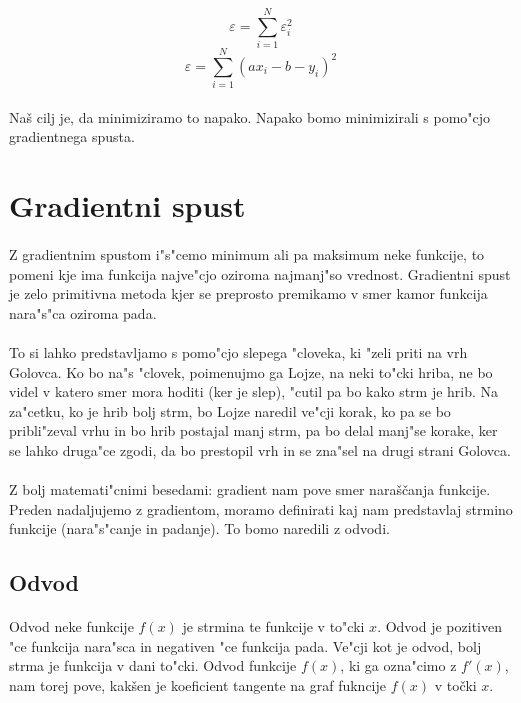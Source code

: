\documentclass[a4paper, 12pt]{article}
\begin{document}
	$$\varepsilon = \sum_{i=1}^{N} \varepsilon_i^2$$
	$$\varepsilon = \sum_{i=1}^{N} (a x_i - b - y_i)^2$$

	\paragraph{}
	Naš cilj je, da minimiziramo to napako. Napako bomo minimizirali s pomo"cjo gradientnega spusta.

	\section*{Gradientni spust}
	\paragraph{}
	Z gradientnim spustom i"s"cemo minimum ali pa maksimum neke funkcije, to pomeni kje ima funkcija najve"cjo oziroma najmanj"so vrednost. Gradientni spust je zelo primitivna metoda kjer se preprosto premikamo v smer kamor funkcija nara"s"ca oziroma pada.

	\paragraph{}
	To si lahko predstavljamo s pomo"cjo slepega "cloveka, ki "zeli priti na vrh Golovca. Ko bo na"s "clovek, poimenujmo ga Lojze, na neki to"cki hriba, ne bo videl v katero smer mora hoditi (ker je slep), "cutil pa bo kako strm je hrib. Na za"cetku, ko je hrib bolj strm, bo Lojze naredil ve"cji korak, ko pa se bo pribli"zeval vrhu in bo hrib postajal manj strm, pa bo delal manj"se korake, ker se lahko druga"ce zgodi, da bo prestopil vrh in se zna"sel na drugi strani Golovca.

	\paragraph{}
	Z bolj matemati"cnimi besedami: gradient nam pove smer naraščanja funkcije. Preden nadaljujemo z gradientom, moramo definirati kaj nam predstavlaj strmino funkcije (nara"s"canje in padanje). To bomo naredili z odvodi.

	\subsection*{Odvod}
	\paragraph{}
	Odvod neke funkcije $f(x)$ je strmina te funkcije v to"cki $x$. Odvod je pozitiven "ce funkcija nara"sca in negativen "ce funkcija pada. Ve"cji kot je odvod, bolj strma je funkcija v dani to"cki. Odvod funkcije $f(x)$, ki ga ozna"cimo z $f'(x)$, nam torej pove, kakšen je koeficient tangente na graf fukncije $ f(x) $ v točki $x$.
\end{document}
